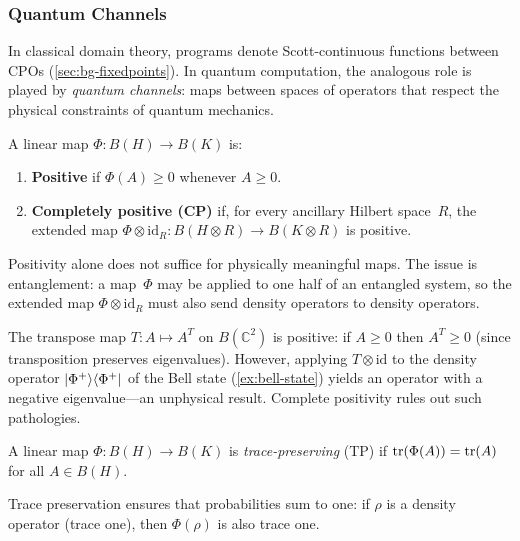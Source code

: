 \subsubsection{Quantum Channels}

In classical domain theory, programs denote Scott-continuous functions
between CPOs (\cref{sec:bg-fixedpoints}).
In quantum computation, the analogous role is played by
\emph{quantum channels}: maps between spaces of operators that
respect the physical constraints of quantum mechanics.

\begin{definition}
\label{def:cp-map}
A linear map $\Phi : B(H) \to B(K)$ is:
\begin{enumerate}
  \item \textbf{Positive} if $\Phi(A) \geq 0$ whenever $A \geq 0$.
  \item \textbf{Completely positive (CP)} if, for every ancillary
    Hilbert space~$R$, the extended map
    $\Phi \otimes \mathrm{id}_R : B(H \otimes R) \to B(K \otimes R)$
    is positive.
\end{enumerate}
\end{definition}

\noindent
Positivity alone does not suffice for physically meaningful maps.
The issue is entanglement: a map~$\Phi$ may be applied to one half of
an entangled system, so the extended map
$\Phi \otimes \mathrm{id}_R$ must also send density operators to
density operators.

\begin{example}
\label{ex:transpose-not-cp}
The transpose map $T : A \mapsto A^T$ on $B(\mathbb{C}^2)$ is
positive: if $A \geq 0$ then $A^T \geq 0$ (since transposition
preserves eigenvalues).
However, applying $T \otimes \mathrm{id}$ to the density operator
$\ket{\Phi^+}\!\bra{\Phi^+}$ of the Bell state
(\cref{ex:bell-state}) yields an operator with a negative
eigenvalue---an unphysical result.
Complete positivity rules out such pathologies.
\end{example}

\begin{definition}
\label{def:tp-map}
A linear map $\Phi : B(H) \to B(K)$ is \emph{trace-preserving} (TP)
if $\operatorname{tr}(\Phi(A)) = \operatorname{tr}(A)$ for all $A \in B(H)$.
\end{definition}

\noindent
Trace preservation ensures that probabilities sum to one: if
$\rho$ is a density operator (trace one), then $\Phi(\rho)$ is also
trace one.

